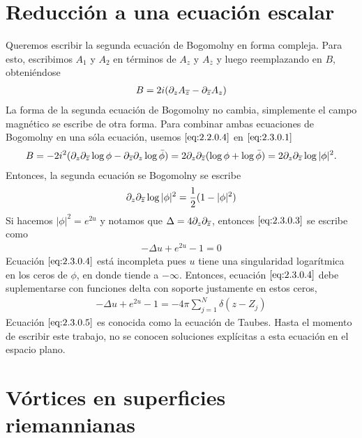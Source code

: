 \section{Reducción a una ecuación escalar}
\label{sec: 2.3}

Queremos escribir la segunda ecuación de Bogomolny en forma compleja. Para esto, escribimos $A_1$ y $A_2$ en términos de $A_z$ y $A_{\overline z}$ y luego reemplazando en $B$, obteniéndose
\begin{align}
    B = 2i(\partial_z A_{\overline z}-\partial_{\overline z} A_z)\label{eq:2.3.0.1}
\end{align}
La forma de la segunda ecuación de Bogomolny no cambia, simplemente el campo magnético se escribe de otra forma. Para combinar ambas ecuaciones de Bogomolny en una sóla ecuación, usemos $\eqref{eq:2.2.0.4}$ en $\eqref{eq:2.3.0.1}$
\begin{align}
    B = -2i^2(\partial_z \partial_{\overline z}\log\phi-\partial_{\overline z}\partial_z\log\bar\phi) = 2\partial_z\partial_{\overline z}(\log\phi+\log\bar\phi) = 2\partial_z\partial_{\overline z}\log|\phi|^2. \label{eq:2.3.0.2}
\end{align}
Entonces, la segunda ecuación se Bogomolny se escribe
\begin{align}
    \partial_z\partial_{\overline z}\log|\phi|^2 = \frac{1}{2}(1-|\phi|^2) \label{eq:2.3.0.3}
\end{align}
Si hacemos $|\phi|^2 = e^{2u}$ y notamos que $\Delta=4\partial_z\partial_{\overline z}$, entonces $\eqref{eq:2.3.0.3}$ se escribe como
\begin{align}
    -\Delta u+e^{2u}-1 =0 \label{eq:2.3.0.4}
\end{align}
Ecuación $\eqref{eq:2.3.0.4}$ está incompleta pues $u$ tiene una singularidad logarítmica en los ceros de $\phi$, en donde tiende a $-\infty$. Entonces, ecuación $\eqref{eq:2.3.0.4}$ debe suplementarse con funciones delta con soporte justamente en estos ceros,
\begin{align}
    -\Delta u+e^{2u}-1 =-4\pi\sum_{j=1}^N\delta(z-Z_j)\label{eq:2.3.0.5}
\end{align}
Ecuación $\eqref{eq:2.3.0.5}$ es conocida como la ecuación de Taubes. Hasta el momento de escribir este trabajo, no se conocen soluciones explícitas a esta ecuación en el espacio plano.

\section{Vórtices en superficies riemannianas}\label{sec2.4}

